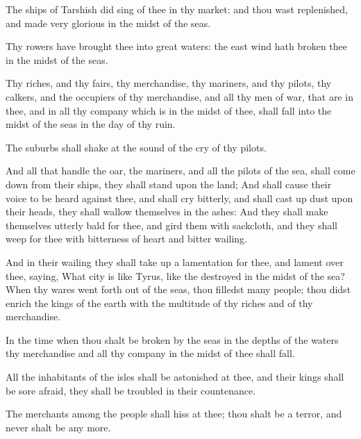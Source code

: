 \verse The ships of Tarshish did sing of thee in thy market: and thou wast replenished, and made very glorious in the midst of the seas.

\verse Thy rowers have brought thee into great waters: the east wind hath broken thee in the midst of the seas.

\verse Thy riches, and thy fairs, thy merchandise, thy mariners, and thy pilots, thy calkers, and the occupiers of thy merchandise, and all thy men of war, that are in thee, and in all thy company which is in the midst of thee, shall fall into the midst of the seas in the day of thy ruin.

\verse The suburbs shall shake at the sound of the cry of thy pilots.

\verse And all that handle the oar, the mariners, and all the pilots of the sea, shall come down from their ships, they shall stand upon the land; \verse And shall cause their voice to be heard against thee, and shall cry bitterly, and shall cast up dust upon their heads, they shall wallow themselves in the ashes: \verse And they shall make themselves utterly bald for thee, and gird them with sackcloth, and they shall weep for thee with bitterness of heart and bitter wailing.

\verse And in their wailing they shall take up a lamentation for thee, and lament over thee, saying, What city is like Tyrus, like the destroyed in the midst of the sea?  \verse When thy wares went forth out of the seas, thou filledst many people; thou didst enrich the kings of the earth with the multitude of thy riches and of thy merchandise.

\verse In the time when thou shalt be broken by the seas in the depths of the waters thy merchandise and all thy company in the midst of thee shall fall.

\verse All the inhabitants of the isles shall be astonished at thee, and their kings shall be sore afraid, they shall be troubled in their countenance.

\verse The merchants among the people shall hiss at thee; thou shalt be a terror, and never shalt be any more.


